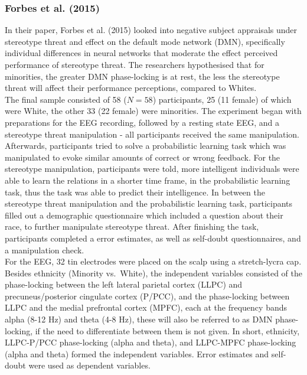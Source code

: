 \documentclass[
  stu]{apa7}
\begin{document}
\subsubsection{Forbes et al. (2015)}\label{forbesspontaneousdefaultmode2015}

In their paper, Forbes et al. (2015) looked into negative subject appraisals under stereotype threat and effect on the default mode network (DMN), specifically individual differences in neural networks that moderate the effect perceived performance of stereotype threat.
The researchers hypothesised that for minorities, the greater DMN phase-locking is at rest, the less the stereotype threat will affect their performance perceptions, compared to Whites.\\
The final sample consisted of 58 (\(N = 58\)) participants, 25 (11 female) of which were White, the other 33 (22 female) were minorities.
The experiment began with preparations for the EEG recording, followed by a resting state EEG, and a stereotype threat manipulation - all participants received the same manipulation.
Afterwards, participants tried to solve a probabilistic learning task which was manipulated to evoke similar amounts of correct or wrong feedback.
For the stereotype manipulation, participants were told, more intelligent individuals were able to learn the relations in a shorter time frame, in the probabilistic learning task, thus the task was able to predict their intelligence.
In between the stereotype threat manipulation and the probabilistic learning task, participants filled out a demographic questionnaire which included a question about their race, to further manipulate stereotype threat.
After finishing the task, participants completed a error estimates, as well as self-doubt questionnaires, and a manipulation check.\\
For the EEG, 32 tin electrodes were placed on the scalp using a stretch-lycra cap.
Besides ethnicity (Minority vs.~White), the independent variables consisted of the phase-locking between the left lateral parietal cortex (LLPC) and precuneus/posterior cingulate cortex (P/PCC), and the phase-locking between LLPC and the medial prefrontal cortex (MPFC), each at the frequency bands alpha (8-12 Hz) and theta (4-8 Hz), these will also be referred to as DMN phase-locking, if the need to differentiate between them is not given.
In short, ethnicity, LLPC-P/PCC phase-locking (alpha and theta), and LLPC-MPFC phase-locking (alpha and theta) formed the independent variables.
Error estimates and self-doubt were used as dependent variables.\\
\end{document}
